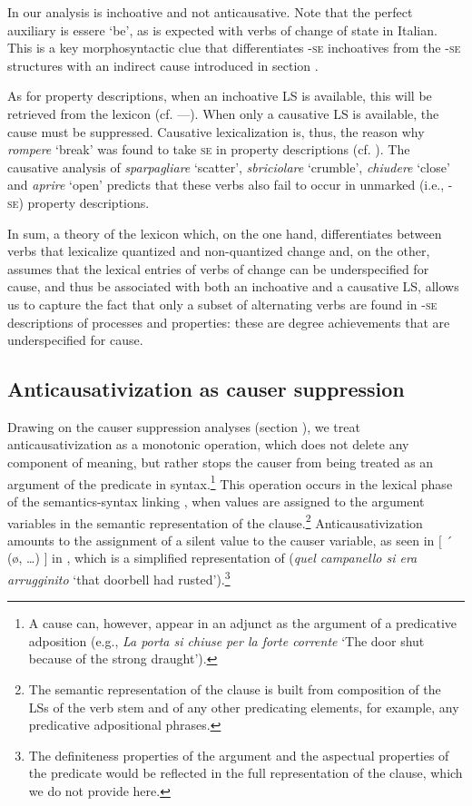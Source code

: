 \documentclass[output=paper,colorlinks,citecolor=brown
]{langscibook}
\begin{document}
In our analysis  is inchoative and not anticausative. Note that the perfect auxiliary is essere ‘be’, as is expected with verbs of change of state in Italian. This is a key morphosyntactic clue that differentiates -\textsc{se} inchoatives from the -\textsc{se} structures with an indirect cause introduced in section . 

As for property descriptions, when an inchoative LS is available, this will be retrieved from the
lexicon (cf. —). When only a causative LS is available, the cause must be suppressed. Causative lexicalization is, thus, the reason why \textit{rompere} ‘break’ was found to take \textsc{se} in property descriptions (cf. ). The causative analysis of \textit{sparpagliare} ‘scatter’, \textit{sbriciolare} ‘crumble’, \textit{chiudere} ‘close’ and \textit{aprire} ‘open’ predicts that these verbs also fail to occur in unmarked (i.e., -\textsc{se}) property descriptions.

In sum, a theory of the lexicon which, on the one hand, differentiates between verbs that lexicalize quantized and non-quantized change and, on the other, assumes that the lexical entries of verbs of change can be underspecified for cause, and thus be associated with both an inchoative and a causative LS, allows us to capture the fact that only a subset of alternating verbs are found in -\textsc{se} descriptions of processes and properties: these are degree achievements that are underspecified for cause.

\subsection{Anticausativization as causer suppression}
\label{bentley_section_5.4}

Drawing on the causer suppression analyses (section ), we treat anticausativization as a monotonic
operation, which does not delete any component of meaning, but rather stops the causer from being
treated as an argument of the predicate in syntax.\footnote{A cause can, however, appear in an
  adjunct as the argument of a predicative adposition (e.g., \textit{La porta si chiuse per la forte
    corrente} ‘The door shut because of the strong draught’). }  This operation occurs in the
lexical phase of the semantics-syntax linking \citep[116—125]{vanvalin2023principles}, when values
are assigned to the argument variables in the semantic representation of the clause.\footnote{The
  semantic representation of the clause is built from composition of the LSs of the verb stem and of
  any other predicating elements, for example, any predicative adpositional
  phrases.} Anticausativization amounts to the assignment of a silent value to the causer variable,
as seen in $\lbrack$ ´ (\o,  \ldots ) $\rbrack$ in , which is a simplified representation of  (\textit{quel campanello si era arrugginito} ‘that doorbell had rusted’).\footnote{The definiteness properties of the argument and the aspectual properties of the predicate would be reflected in the full representation of the clause, which we do not provide here.}
\end{document}

